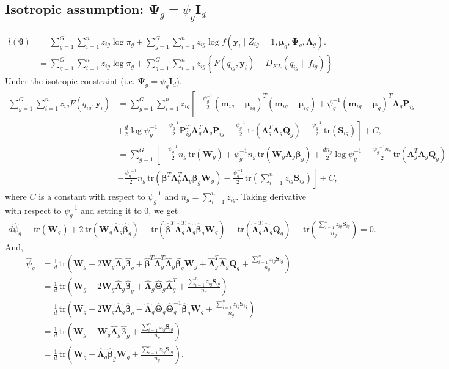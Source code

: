\documentclass[12pt]{article}
\newcommand{\bI}{\mathbf{I}}
\newcommand{\bP}{\mathbf{P}}
\newcommand{\bQ}{\mathbf{Q}}
\newcommand{\bW}{\mathbf{W}}
\newcommand{\bmm}{\mathbf{m}}
\newcommand{\by}{\mathbf{y}}
\newcommand{\bbeta}{\boldsymbol{\beta}}
\newcommand{\bTheta}{\boldsymbol{\Theta}}
\newcommand{\bmu}{\boldsymbol{\mu}}
\newcommand{\bLambda}{\boldsymbol{\Lambda}}
\newcommand{\bPsi}{\boldsymbol{\Psi}}
\newcommand{\tr}{\,\mbox{tr}}
\begin{document}
\subsection{Isotropic assumption: $\bPsi_g = \psi_g \bI_d$}
\begin{align*}
l(\boldsymbol{\vartheta})&=\sum_{g=1}^G\sum_{i=1}^n z_{ig}\log \pi_g+ \sum_{g=1}^G\sum_{i=1}^n z_{ig}\log f(\by_{i}\mid Z_{ig}=1, \bmu_g,\bPsi_g,\bLambda_g).\\
&=\sum_{g=1}^G\sum_{i=1}^n z_{ig}\log \pi_g+ \sum_{g=1}^G\sum_{i=1}^n z_{ig} \left \{F(q_{ig},\by_i) + D_{KL}(q_{ig}\mid\mid f_{ig})\right \}
\end{align*}
Under the isotropic constraint (i.e. $\bPsi_g = \psi_g \bI_d$),
\begin{align*}
\sum_{g=1}^G\sum_{i=1}^nz_{ig}F(q_{ig},\by_i)&=\sum_{g=1}^G\sum_{i=1}^nz_{ig}\left[-\frac{\psi_g^{-1}}{2}(\bmm_{ig}-\bmu_{ig})^T(\bmm_{ig}-\bmu_{ig})+\psi_g^{-1}(\bmm_{ig}-\bmu_g)^T\bLambda_g\bP_{ig}  \right.\\
&\left.+\frac{d}{2} \log \psi_g^{-1}-\frac{\psi_g^{-1}}{2}\bP_{ig}^T\bLambda_g^T\bLambda_g\bP_{ig}-\frac{\psi_g^{-1}}{2}\tr(\bLambda_g^T\bLambda_g\bQ_{g})-\frac{\psi_g^{-1}}{2}\tr\left(\mathbf{S}_{ig}\right)  \right]+C,\\[3pt]
&=\sum_{g=1}^G\left[-\frac{\psi_g^{-1}}{2}n_g\tr(\bW_{g})+\psi_g^{-1}n_g\tr(\bW_g\bLambda_g\bbeta_g)+\frac{dn_g}{2}\log \psi_g^{-1}-\frac{\psi_g{^{-1}}n_g}{2}\tr(\bLambda_g^T\bLambda_g\bQ_{g})\right.\\
&\left.-\frac{\psi_g{^{-1}}}{2}n_g\tr(\bbeta^T\bLambda_g^T\bLambda_g\bbeta_g\bW_g)-\frac{\psi_g^{-1}}{2}\tr\left(\sum_{i=1}^nz_{ig}\mathbf{S}_{ig}\right)\right]+C,
\end{align*}
where $C$ is a constant with respect to $\psi_g^{-1}$ and $n_g=\sum_{i=1}^nz_{ig}$. Taking derivative with respect to $\psi^{-1}_g$ and setting it to 0, we get
\begin{align*}
d\hat{\psi}_g-\tr(\bW_g)+2\tr(\bW_g\hat{\bLambda}_g\hat{\bbeta}_g)-\tr(\hat{\bbeta}^T\hat{\bLambda}_g^T\hat{\bLambda}_g\hat{\bbeta}_g\bW_g)-\tr(\hat{\bLambda}_g^T\hat{\bLambda}_g\bQ_{g})-\tr\left(\frac{\sum_{i=1}^nz_{ig}\mathbf{S}_{ig}}{n_g}\right)=0.
\end{align*}
And,
\begin{align*}
\hat{\psi}_g&=\frac{1}{d}\tr\left(\bW_g-2\bW_g\hat{\bLambda}_g\hat{\bbeta}_g+\hat{\bbeta}^T\hat{\bLambda}_g^T\hat{\bLambda}_g\hat{\bbeta}_g\bW_g+\hat{\bLambda}_g^T\hat{\bLambda}_g\bQ_{g}+\frac{\sum_{i=1}^nz_{ig}\mathbf{S}_{ig}}{n_g}\right)\\
&=\frac{1}{d}\tr\left(\bW_g-2\bW_g\hat{\bLambda}_g\hat{\bbeta}_g+\hat{\bLambda}_g\hat{\bTheta}_g\hat{\bLambda}_g^T+\frac{\sum_{i=1}^nz_{ig}\mathbf{S}_{ig}}{n_g}\right)\\
&=\frac{1}{d}\tr\left(\bW_g-2\bW_g\hat{\bLambda}_g\hat{\bbeta}_g-\hat{\bLambda}_g\hat{\bTheta}_g\hat{\bTheta}_g^{-1}\hat{\bbeta}_g\bW_g+\frac{\sum_{i=1}^nz_{ig}\mathbf{S}_{ig}}{n_g}\right)\\
&=\frac{1}{d}\tr\left(\bW_g-\bW_g\hat{\bLambda}_g\hat{\bbeta}_g+\frac{\sum_{i=1}^nz_{ig}\mathbf{S}_{ig}}{n_g}\right)\\
&=\frac{1}{d}\tr\left(\bW_g-\hat{\bLambda}_g\hat{\bbeta}_g\bW_g+\frac{\sum_{i=1}^nz_{ig}\mathbf{S}_{ig}}{n_g}\right).
\end{align*}
\end{document}
